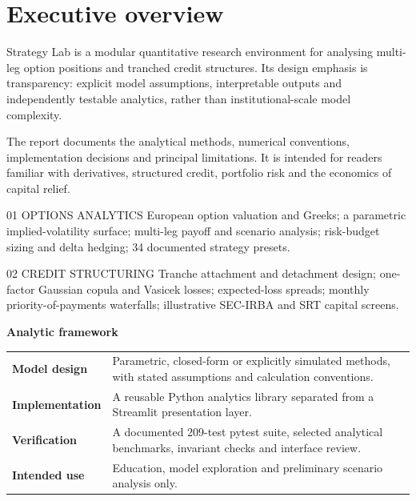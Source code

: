\documentclass[10pt,a4paper]{article}
\numberwithin{equation}{section}
\begin{document}
\section*{Executive overview}
\vspace{1mm}
Strategy Lab is a modular quantitative research environment for analysing multi-leg option positions and tranched credit structures. Its design emphasis is transparency: explicit model assumptions, interpretable outputs and independently testable analytics, rather than institutional-scale model complexity.

The report documents the analytical methods, numerical conventions, implementation decisions and principal limitations. It is intended for readers familiar with derivatives, structured credit, portfolio risk and the economics of capital relief.
\par\vspace{5mm}
\noindent\begin{minipage}[t]{0.49\textwidth}
\begin{overviewbox}{01 \quad OPTIONS ANALYTICS}
\small European option valuation and Greeks; a parametric implied-volatility surface; multi-leg payoff and scenario analysis; risk-budget sizing and delta hedging; 34 documented strategy presets.
\end{overviewbox}
\end{minipage}\hfill
\begin{minipage}[t]{0.49\textwidth}
\begin{overviewbox}{02 \quad CREDIT STRUCTURING}
\small Tranche attachment and detachment design; one-factor Gaussian copula and Vasicek losses; expected-loss spreads; monthly priority-of-payments waterfalls; illustrative SEC-IRBA and SRT capital screens.
\end{overviewbox}
\end{minipage}
\par\vspace{8mm}
{\sffamily\bfseries\color{Navy} Analytic framework}\par
\vspace{2mm}
\begin{tabular}{@{}p{.23\linewidth}p{.70\linewidth}@{}}
\textcolor{Accent}{\sffamily\bfseries Model design} & Parametric, closed-form or explicitly simulated methods, with stated assumptions and calculation conventions.\\[2mm]
\textcolor{Accent}{\sffamily\bfseries Implementation} & A reusable Python analytics library separated from a Streamlit presentation layer.\\[2mm]
\textcolor{Accent}{\sffamily\bfseries Verification} & A documented 209-test pytest suite, selected analytical benchmarks, invariant checks and interface review.\\[2mm]
\textcolor{Accent}{\sffamily\bfseries Intended use} & Education, model exploration and preliminary scenario analysis only.\\
\end{tabular}
\end{document}

